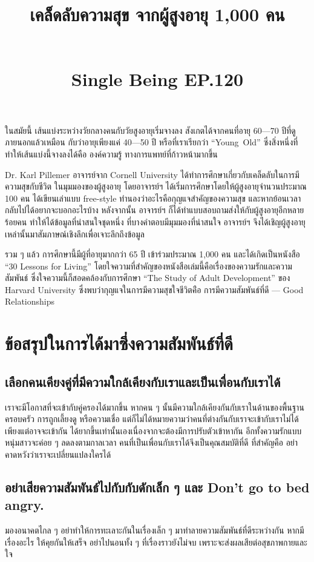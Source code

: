 \documentclass{article}
\title{\flushleft\Huge\textbf{เคล็ดลับความสุข จากผู้สูงอายุ 1,000 คน}\\
\normalsize\rule{0em}{1ex}\\
\Large Single Being EP.120}
\author{}
\date{}
\begin{document}
\maketitle
\sloppy
\flushleft

ในสมัยนี้ เส้นแบ่งระหว่างวัยกลางคนกับวัยสูงอายุเริ่มจางลง สังเกตได้จากคนที่อายุ 60---70 ปีที่ดูภายนอกแล้วเหมือน
กับว่าอายุเพียงแค่ 40---50 ปี หรือที่เราเรียกว่า \mbox{``Young Old''} ซึ่งสิ่งหนึ่งที่ทำให้เส้นแบ่งนี้จางลงได้คือ องค์ความรู้
ทางการแพทย์ที่ก้าวหน้ามากขึ้น

\rule{0em}{1ex}

Dr. Karl Pillemer อาจารย์จาก Cornell University ได้ทำการศึกษาเกี่ยวกับเคล็ดลับในการมีความสุขกับชีวิต
ในมุมมองของผู้สูงอายุ โดยอาจารย์ฯ ได้เริ่มการศึกษาโดยให้ผู้สูงอายุจำนวนประมาณ 100 คน ได้เขียนเล่าแบบ
free-style ทำนองว่าอะไรคือกุญแจสำคัญของความสุข และหากย้อนเวลากลับไปได้อยากจะบอกอะไรบ้าง
หลังจากนั้น อาจารย์ฯ ก็ได้ทำแบบสอบถามส่งให้กับผู้สูงอายุอีกหลายร้อยคน ทำให้ได้ข้อมูลที่น่าสนใจชุดหนึ่ง
ที่บางคำตอบมีมุมมองที่น่าสนใจ อาจารย์ฯ จึงได้เชิญผู้สูงอายุเหล่านั้นมาสัมภาษณ์เชิงลึกเพื่อเจาะลึกถึงข้อมูล

\rule{0em}{1ex}

รวม ๆ แล้ว การศึกษานี้มีผู้ที่อายุมากกว่า 65 ปี เข้าร่วมประมาณ 1,000 คน และได้เกิดเป็นหนังสือ
``30 Lessons for Living'' โดยใจความที่สำคัญของหนังสือเล่มนี้คือเรื่องของความรักและความสัมพันธ์
ซึ่งใจความนี้ก็สอดคล้องกับการศึกษา ``The Study of Adult Development'' ของ Harvard University
ซึ่งพบว่ากุญแจในการมีความสุขใจชีวิตค่ือ การมีความสัมพันธ์ที่ดี --- Good Relationships

\rule{0em}{1ex}

\section*{ข้อสรุปในการได้มาซึ่งความสัมพันธ์ที่ดี}


\subsection*{เลือกคนเคียงคู่ที่มีความใกล้เคียงกับเราและเป็นเพื่อนกับเราได้}
เราจะมีโอกาสที่จะเข้ากับคู่ครองได้มากขึ้น หากคน ๆ นั้นมีความใกล้เคียงกันกับเราในด้านของพื้นฐานครอบครัว
การถูกเลี้ยงดู หรือความเชื่อ แต่ก็ไม่ได้หมายความว่าคนที่ต่างกันกับเราจะเข้ากับเราไม่ได้ เพียงแต่อาจจะเข้ากัน
ได้ยากขึ้นเท่านั้นเองเนื่องจากจะต้องมีการปรับตัวเข้าหากัน อีกทั้งความรักแบบหนุ่มสาวจะค่อย ๆ ลดลงตามกาลเวลา 
คนที่เป็นเพื่อนกับเราได้จึงเป็นคุณสมบัติที่ดี ที่สำคัญคือ อย่าคาดหวังว่าเราจะเปลี่ยนแปลงใครได้

\subsection*{อย่าเสียความสัมพันธ์ไปกับกับดักเล็ก ๆ และ Don't go to bed angry.}
มองอนาคตไกล ๆ อย่าทำให้การทะเลาะกันในเรื่องเล็ก ๆ มาทำลายความสัมพันธ์ที่ดีระหว่างกัน
หากมีเรื่องอะไร ให้คุยกันให้เสร็จ อย่าไปนอนทั้ง ๆ ที่เรื่องราวยังไม่จบ เพราะจะส่งผลเสียต่อสุขภาพกายและใจ
\end{document}

